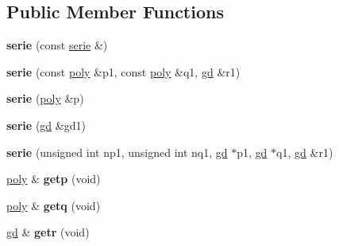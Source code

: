 \subsection*{Public Member Functions}
\begin{DoxyCompactItemize}
\item 
\mbox{\label{classmmgd_1_1serie_aaa97a51daa7e06a231be806a84bd6073}} 
{\bfseries serie} (const \mbox{\hyperlink{classmmgd_1_1serie}{serie}} \&)
\item 
\mbox{\label{classmmgd_1_1serie_a2e5e176ba9944ac572e1999018e44886}} 
{\bfseries serie} (const \mbox{\hyperlink{classmmgd_1_1poly}{poly}} \&p1, const \mbox{\hyperlink{classmmgd_1_1poly}{poly}} \&q1, \mbox{\hyperlink{classmmgd_1_1gd}{gd}} \&r1)
\item 
\mbox{\label{classmmgd_1_1serie_a4725a58c8ea4de37d2cdd88dd5b4c914}} 
{\bfseries serie} (\mbox{\hyperlink{classmmgd_1_1poly}{poly}} \&p)
\item 
\mbox{\label{classmmgd_1_1serie_a33e8a0a46077473352724801e10b3cf6}} 
{\bfseries serie} (\mbox{\hyperlink{classmmgd_1_1gd}{gd}} \&gd1)
\item 
\mbox{\label{classmmgd_1_1serie_af3813bfd7099de4e1b0493dc310bd3fc}} 
{\bfseries serie} (unsigned int np1, unsigned int nq1, \mbox{\hyperlink{classmmgd_1_1gd}{gd}} $\ast$p1, \mbox{\hyperlink{classmmgd_1_1gd}{gd}} $\ast$q1, \mbox{\hyperlink{classmmgd_1_1gd}{gd}} \&r1)
\item 
\mbox{\label{classmmgd_1_1serie_a38fbdc0f684b65730903fcc2a75c2e06}} 
\mbox{\hyperlink{classmmgd_1_1poly}{poly}} \& {\bfseries getp} (void)
\item 
\mbox{\label{classmmgd_1_1serie_a67c4d214b2e02022f54ff8ff63e657f9}} 
\mbox{\hyperlink{classmmgd_1_1poly}{poly}} \& {\bfseries getq} (void)
\item 
\mbox{\label{classmmgd_1_1serie_a0650364b2ecc501864fa6e684053aa57}} 
\mbox{\hyperlink{classmmgd_1_1gd}{gd}} \& {\bfseries getr} (void)
\item 
\mbox{\label{classmmgd_1_1serie_a066f2b3c24ff28b1b771040c7e01166e}} 

\end{DoxyCompactItemize}
